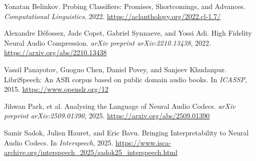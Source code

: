 \documentclass[11pt]{article}
\begin{document}

\begin{thebibliography}{}

Yonatan Belinkov.
\newblock Probing Classifiers: Promises, Shortcomings, and Advances.
\newblock \emph{Computational Linguistics}, 2022.
\newblock \url{https://aclanthology.org/2022.cl-1.7/}

Alexandre Défossez, Jade Copet, Gabriel Synnaeve, and Yossi Adi.
\newblock High Fidelity Neural Audio Compression.
\newblock \emph{arXiv preprint arXiv:2210.13438}, 2022.
\newblock \url{https://arxiv.org/abs/2210.13438}

Vassil Panayotov, Guoguo Chen, Daniel Povey, and Sanjeev Khudanpur.
\newblock LibriSpeech: An ASR corpus based on public domain audio books.
\newblock In \emph{ICASSP}, 2015.
\newblock \url{https://www.openslr.org/12}

Jihwan Park, et al.
\newblock Analysing the Language of Neural Audio Codecs.
\newblock \emph{arXiv preprint arXiv:2509.01390}, 2025.
\newblock \url{https://arxiv.org/abs/2509.01390}

Samir Sadok, Julien Hauret, and Eric Bavu.
\newblock Bringing Interpretability to Neural Audio Codecs.
\newblock In \emph{Interspeech}, 2025.
\newblock \url{https://www.isca-archive.org/interspeech_2025/sadok25_interspeech.html}

\end{thebibliography}
\end{document}

